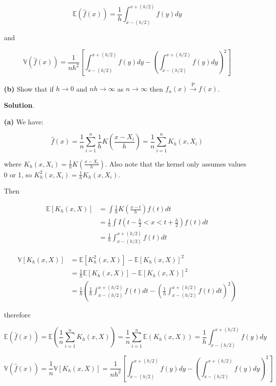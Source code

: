 \[\mathbb{E}(\hat{f}(x)) = \frac{1}{h} \int_{x-(h/2)}^{x+(h/2)} f(y) dy\]

and

\[\mathbb{V}(\hat{f}(x)) = \frac{1}{nh^{2}} \left[ \int_{x-(h/2)}^{x+(h/2)} f(y) dy  - \left( \int_{x-(h/2)}^{x+(h/2)} f(y) dy \right)^{2}\right]\]

\textbf{(b)} Show that if \(h \rightarrow 0\) and
\(nh \rightarrow \infty\) as \(n \rightarrow \infty\) then
\(f_{n}(x) \xrightarrow{\text{P}} f(x)\).

\textbf{Solution}.

\textbf{(a)} We have:

\[ \hat{f}(x) = \frac{1}{n} \sum_{i=1}^{n} \frac{1}{h} K\left( \frac{x - X_{i}}{h} \right) = \frac{1}{n} \sum_{i=1}^{n} K_h(x, X_{i})\]

where \(K_h(x, X_{i}) = \frac{1}{h} K\left( \frac{x - X_{i}}{h} \right)\).
Also note that the kernel only assumes values 0 or 1, so
\(K_h^{2}(x, X_{i}) = \frac{1}{h} K_h(x, X_{i})\).

Then

\begin{align*}
\mathbb{E}[K_h(x, X)] &= \int \frac{1}{h} K\left( \frac{x - t}{h} \right) f(t) dt \\
&= \frac{1}{h} \int I \left(t - \frac{h}{2} < x < t + \frac{h}{2} \right) f(t) dt \\
&= \frac{1}{h} \int_{x - (h/2)}^{x + (h/2)} f(t) dt
\end{align*}

\begin{align*}
\mathbb{V}[K_h(x, X)] &= \mathbb{E}[K_h^{2}(x, X)] - \mathbb{E}[K_h(x, X)]^{2} \\
&= \frac{1}{h} \mathbb{E}[K_h(x, X)] - \mathbb{E}[K_h(x, X)]^{2} \\
&= \frac{1}{h} \left(\frac{1}{h} \int_{x - (h/2)}^{x + (h/2)} f(t) dt - \left(\frac{1}{h} \int_{x - (h/2)}^{x + (h/2)} f(t) dt \right)^{2} \right)
\end{align*}

therefore

\[\mathbb{E}(\hat{f}(x)) = \mathbb{E} \left( \frac{1}{n} \sum_{i=1}^{n} K_h(x, X) \right) = \frac{1}{n} \sum_{i=1}^{n}  \mathbb{E} \left( K_h(x, X)  \right) = \frac{1}{h} \int_{x - (h/2)}^{x + (h/2)} f(y) dy \]

\[\mathbb{V}(\hat{f}(x)) = \frac{1}{n} \mathbb{V}[K_h(x, X)] = \frac{1}{nh^{2}} \left[ \int_{x-(h/2)}^{x+(h/2)} f(y) dy  - \left( \int_{x-(h/2)}^{x+(h/2)} f(y) dy \right)^{2}\right] \]

